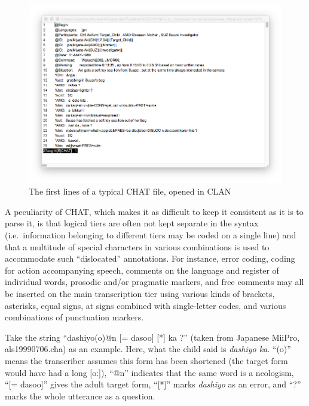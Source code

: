 \documentclass[a4paper, 11pt]{book}
\begin{document}
\begin{figure}[ht!]
	\centering
	\includegraphics[scale=0.55]{pics/chat-screenshot.png}
	\caption{The first lines of a typical CHAT file, opened in CLAN}
	\label{fig:CHAT example}
\end{figure}

A peculiarity of CHAT, which makes it as difficult to keep it consistent as it is to parse it, is that logical tiers are often not kept separate in the syntax (i.e.\ information belonging to different tiers may be coded on a single line) and that a multitude of special characters in various combinations is used to accommodate such “dislocated” annotations. For instance, error coding, coding for action accompanying speech, comments on the language and register of individual words, prosodic and/or pragmatic markers, and free comments may all be inserted on the main transcription tier using various kinds of brackets, asterisks, equal signs, at signs combined with single-letter codes, and various combinations of punctuation markers. 

Take the string “dashiyo(o)@n [= dasoo] [*] ka ?” (taken from Japanese MiiPro, als19990706.cha) as an example. Here, what the child said is \emph{dashiyo ka}. “(o)” means the transcriber assumes this form has been shortened (the target form would have had a long [oː]), “@n” indicates that the same word is a neologism, “[= dasoo]” gives the adult target form, “[*]” marks \emph{dashiyo} as an error, and “?” marks the whole utterance as a question. 

\end{document}
